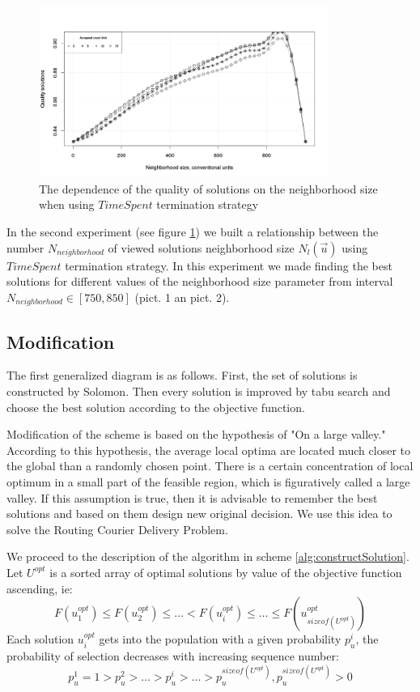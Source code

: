 \documentclass[]{TAACpaper}
\begin{document}
\begin{figure}[h]
	\hfil\includegraphics[height=2.2in]{images/acceptedCountLimit}\hfil
	\caption
	{
	  The dependence of the quality of solutions on the neighborhood size when using $ TimeSpent $ termination strategy
	}
	\label{aba:fig4}
\end{figure}

In the second experiment (see figure \ref{aba:fig4}) we built a relationship between the number $N_{neighborhood}$ of viewed solutions neighborhood size $N_l(\vec{u})$ using $TimeSpent$ termination strategy. In this experiment we made finding the best solutions for different values of the neighborhood size parameter from interval $N_{neighborhood} \in [750, 850]$ (pict. 1 an pict. 2).

\subsection{Modification}

The first generalized diagram is as follows. First, the set of solutions is constructed by Solomon. Then every solution is improved by tabu search and choose the best solution according to the objective function.

Modification of the scheme is based on the hypothesis of "On a large valley." According to this hypothesis, the average local optima are located much closer to the global than a randomly chosen point. There is a certain concentration of local optimum in a small part of the feasible region, which is figuratively called a large valley. If this assumption is true, then it is advisable to remember the best solutions and based on them design new original decision. We use this idea to solve the  Routing Courier Delivery Problem.

We proceed to the description of the algorithm in scheme \ref{alg:constructSolution}. Let $U^{opt}$ is a sorted array of optimal solutions by value of the objective function ascending,  ie:
\begin{equation} \label{u_sorted}
F(u^{opt}_1) \leq F(u^{opt}_2) \leq \ldots < F(u^{opt}_i) \leq \ldots \leq F(u^{opt}_{sizeof(U^{opt})})
\end{equation}
Each solution $u^{opt}_i$ gets into the population with a given probability $p^i_u$, the probability of selection decreases with increasing sequence number:
\begin{equation} \label{p_sorted}
p^1_u = 1 > p^2_u > \ldots > p^i_u> \ldots   > p^{sizeof(U^{opt})}_u,  p^{sizeof(U^{opt})}_u > 0
\end{equation}
\end{document}
